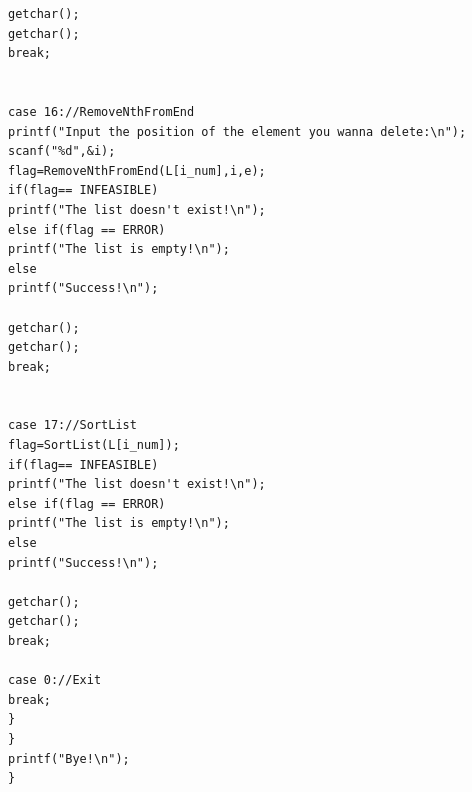 \documentclass[supercite]{Experimental_Report}
\theoremstyle{definition}
\begin{document}
\begin{lstlisting}
getchar(); 
getchar();
break;


case 16://RemoveNthFromEnd
printf("Input the position of the element you wanna delete:\n");
scanf("%d",&i);
flag=RemoveNthFromEnd(L[i_num],i,e);
if(flag== INFEASIBLE) 
printf("The list doesn't exist!\n");
else if(flag == ERROR) 
printf("The list is empty!\n");
else
printf("Success!\n");

getchar(); 
getchar();
break;


case 17://SortList
flag=SortList(L[i_num]);
if(flag== INFEASIBLE) 
printf("The list doesn't exist!\n");
else if(flag == ERROR) 
printf("The list is empty!\n");
else
printf("Success!\n");

getchar(); 
getchar();
break;

case 0://Exit
break;
}
}
printf("Bye!\n");
}
\end{lstlisting}
\newpage
\end{document}
